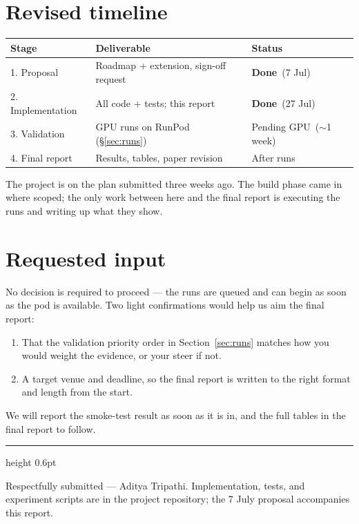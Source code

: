 \documentclass[11pt]{article}
\newcommand{\done}{\textcolor{gooddk}{\textbf{Done}}}
\newcommand{\pending}{\textcolor{pend}{Pending GPU}}
\begin{document}
\section{Revised timeline}

\begin{center}
\small
\begin{tabular}{@{}l l l@{}}
\toprule
Stage & Deliverable & Status \\
\midrule
1. Proposal        & Roadmap + extension, sign-off request & \done\ (7 Jul) \\
2. Implementation  & All code + tests; this report          & \done\ (27 Jul) \\
3. Validation      & GPU runs on RunPod (\S\ref{sec:runs})   & \pending\ ($\sim$1 week) \\
4. Final report    & Results, tables, paper revision         & After runs \\
\bottomrule
\end{tabular}
\end{center}

The project is on the plan submitted three weeks ago. The build phase came in
where scoped; the only work between here and the final report is executing the
runs and writing up what they show.

\section{Requested input}

No decision is required to proceed --- the runs are queued and can begin as soon
as the pod is available. Two light confirmations would help us aim the final
report:

\begin{enumerate}
  \item That the validation priority order in Section~\ref{sec:runs} matches how
    you would weight the evidence, or your steer if not.
  \item A target venue and deadline, so the final report is written to the right
    format and length from the start.
\end{enumerate}

We will report the smoke-test result as soon as it is in, and the full tables in
the final report to follow.

\vspace{0.8em}
{\color{rule}\hrule height 0.6pt}
\vspace{0.4em}
{\color{softgrey}\small Respectfully submitted --- Aditya Tripathi. Implementation, tests, and experiment scripts are in the project repository; the 7 July proposal accompanies this report.}
\end{document}
